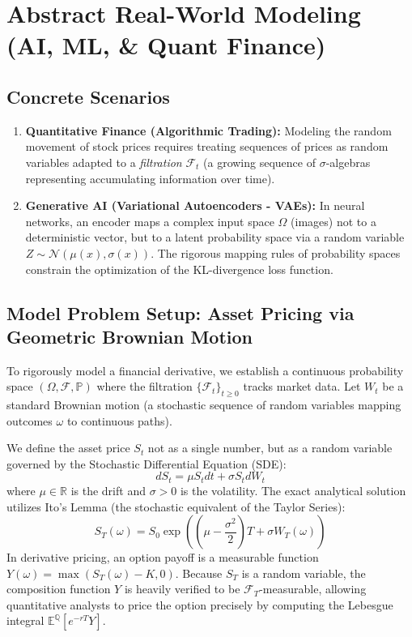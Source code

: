\documentclass[11pt]{article}
\theoremstyle{definition}
\theoremstyle{plain}
\theoremstyle{remark}
\newcommand{\R}{\mathbb{R}}
\newcommand{\F}{\mathcal{F}}
\newcommand{\E}{\mathbb{E}}
\newcommand{\1}{\mathbf{1}}
\begin{document}
\section{Abstract Real-World Modeling (AI, ML, \& Quant Finance)}

\subsection{Concrete Scenarios}
\begin{enumerate}
    \item \textbf{Quantitative Finance (Algorithmic Trading):} Modeling the random movement of stock prices requires treating sequences of prices as random variables adapted to a \textit{filtration} $\F_t$ (a growing sequence of $\sigma$-algebras representing accumulating information over time).
    \item \textbf{Generative AI (Variational Autoencoders - VAEs):} In neural networks, an encoder maps a complex input space $\Omega$ (images) not to a deterministic vector, but to a latent probability space via a random variable $Z \sim \mathcal{N}(\mu(x), \sigma(x))$. The rigorous mapping rules of probability spaces constrain the optimization of the KL-divergence loss function.
\end{enumerate}

\subsection{Model Problem Setup: Asset Pricing via Geometric Brownian Motion}
To rigorously model a financial derivative, we establish a continuous probability space $(\Omega, \F, \mathbb{P})$ where the filtration $\{\F_t\}_{t \ge 0}$ tracks market data. Let $W_t$ be a standard Brownian motion (a stochastic sequence of random variables mapping outcomes $\omega$ to continuous paths).

We define the asset price $S_t$ not as a single number, but as a random variable governed by the Stochastic Differential Equation (SDE):
\[ dS_t = \mu S_t dt + \sigma S_t dW_t \]
where $\mu \in \R$ is the drift and $\sigma > 0$ is the volatility. The exact analytical solution utilizes Ito's Lemma (the stochastic equivalent of the Taylor Series):
\[ S_T(\omega) = S_0 \exp\left( \left(\mu - \frac{\sigma^2}{2}\right)T + \sigma W_T(\omega) \right) \]
In derivative pricing, an option payoff is a measurable function $Y(\omega) = \max(S_T(\omega) - K, 0)$. Because $S_T$ is a random variable, the composition function $Y$ is heavily verified to be $\F_T$-measurable, allowing quantitative analysts to price the option precisely by computing the Lebesgue integral $\E^{\mathbb{Q}}[e^{-rT}Y]$.
\end{document}
